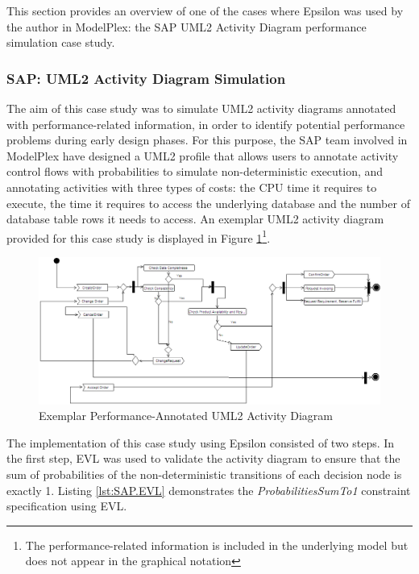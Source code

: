 This section provides an overview of one of the cases where Epsilon was used by the author in ModelPlex: the SAP UML2 Activity Diagram performance simulation case study.

\subsubsection{SAP: UML2 Activity Diagram Simulation}

The aim of this case study was to simulate UML2 activity diagrams annotated with performance-related information, in order to identify potential performance problems during early design phases. For this purpose, the SAP team involved in ModelPlex have designed a UML2 profile that allows users to annotate activity control flows with probabilities to simulate non-deterministic execution, and annotating activities with three types of costs: the CPU time it requires to execute, the time it requires to access the underlying database and the number of database table rows it needs to access. An exemplar UML2 activity diagram provided for this case study is displayed in Figure \ref{fig:SAPExample}\footnote{The performance-related information is included in the underlying model but does not appear in the graphical notation}.

\begin{landscape}
\begin{figure}
	\centering
	\includegraphics[width=18cm]{images/SAPExample.png}
	\caption{Exemplar Performance-Annotated UML2 Activity Diagram}
	\label{fig:SAPExample}
\end{figure}
\end{landscape}

The implementation of this case study using Epsilon consisted of two steps. In the first step, EVL was used to validate the activity diagram to ensure that the sum of probabilities of the non-deterministic transitions of each decision node is exactly 1. Listing \ref{lst:SAP.EVL} demonstrates the \emph{ProbabilitiesSumTo1} constraint specification using EVL. 

